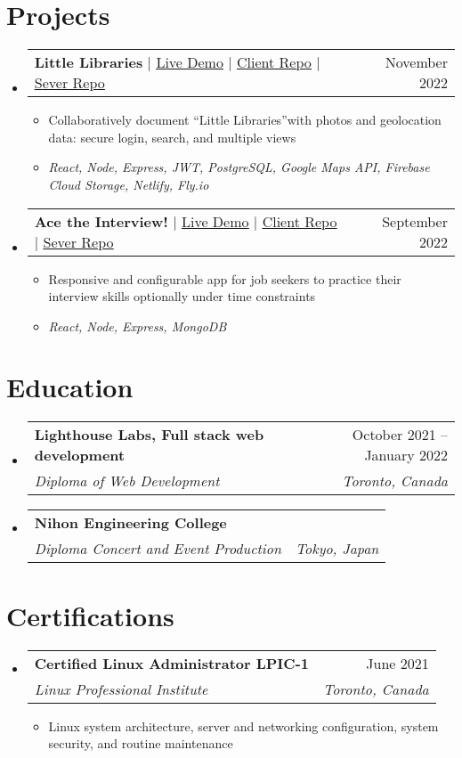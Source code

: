 \documentclass[letterpaper,11pt]{article}
\makeatletter
\newcommand{\resumeItem}[1]{
  \item\small{
    {#1 \vspace{-2pt}}
  }
}
\newcommand{\resumeSubheading}[4]{
  \vspace{-2pt}\item
    \begin{tabular*}{0.97\textwidth}[t]{l@{\extracolsep{\fill}}r}
      \textbf{#1} & #2 \\
      \textit{\small#3} & \textit{\small #4} \\
    \end{tabular*}\vspace{-7pt}
}
\newcommand{\resumeProjectHeading}[2]{
    \item
    \begin{tabular*}{0.97\textwidth}{l@{\extracolsep{\fill}}r}
      \small#1 & #2 \\
    \end{tabular*}\vspace{-7pt}
}
\newcommand{\resumeSubHeadingListStart}{\begin{itemize}[leftmargin=0.15in, label={}]}
\newcommand{\resumeSubHeadingListEnd}{\end{itemize}}
\newcommand{\resumeItemListStart}{\begin{itemize}}
\newcommand{\resumeItemListEnd}{\end{itemize}\vspace{-5pt}}
\makeatother
\begin{document}
\section{Projects}
    \resumeSubHeadingListStart
    \resumeProjectHeading
          {\textbf{Little Libraries} $|$ \href{https://littlelibraries.netlify.app/}{\underline{Live Demo}} $|$ \href{https://github.com/CarlSmoky/little_libraries_client}{\underline{Client Repo}} $|$ \href{https://github.com/CarlSmoky/little_libraries}{\underline{Sever Repo}}}{November 2022}
          \resumeItemListStart
            \resumeItem{Collaboratively document “Little Libraries”with photos and geolocation data:  secure login, search, and multiple views}
            \resumeItem{\emph{React, Node, Express, JWT, PostgreSQL, Google Maps API, Firebase Cloud Storage, Netlify, Fly.io }}
          \resumeItemListEnd
      \resumeProjectHeading
          {\textbf{Ace the Interview!} $|$ \href{https://acetheinterview.netlify.app/}{\underline{Live Demo}} $|$ \href{https://github.com/CarlSmoky/interview_client}{\underline{Client Repo}} $|$ \href{https://github.com/CarlSmoky/interview-server}{\underline{Sever Repo}} }{September 2022}
          \resumeItemListStart
            \resumeItem{Responsive and configurable app for job seekers to practice their interview skills optionally under time constraints}
            \resumeItem{\emph{React, Node, Express, MongoDB}}
          \resumeItemListEnd
    \resumeSubHeadingListEnd



%


\section{Education}
  \resumeSubHeadingListStart
    \resumeSubheading
      {Lighthouse Labs, Full stack web development}{October 2021 -- January 2022}
      {Diploma of Web Development}{Toronto, Canada}
    \resumeSubheading
      {Nihon Engineering College}{}
      {Diploma Concert and Event Production}{Tokyo, Japan}
  \resumeSubHeadingListEnd



\section{Certifications}
  \resumeSubHeadingListStart
    \resumeSubheading
      {Certified Linux Administrator LPIC-1}{June 2021}
      {Linux Professional Institute}{Toronto, Canada}
     \resumeItemListStart
        \resumeItem{}
          {Linux system architecture, server and networking configuration, system security, and routine maintenance}
     \resumeItemListEnd
  \resumeSubHeadingListEnd


\end{document}
